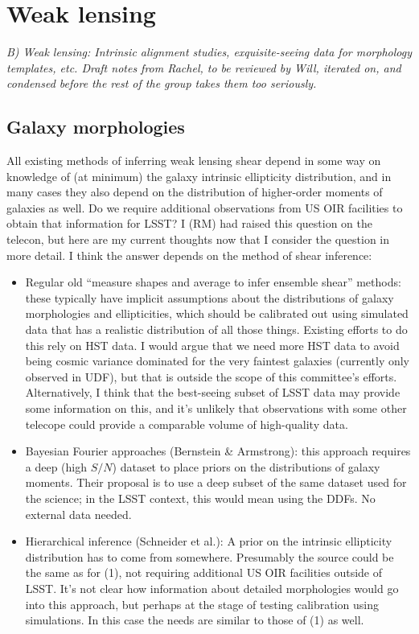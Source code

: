\section{Weak lensing}
\label{sec:wl}

{\it B) Weak lensing: Intrinsic alignment studies, exquisite-seeing data
for morphology templates, etc. Draft notes from Rachel, to be reviewed
by Will, iterated on, and condensed before the rest of the group takes
them too seriously.}

\subsection{Galaxy morphologies}

All existing methods of inferring weak lensing shear depend in some way on knowledge of (at minimum)
the galaxy intrinsic ellipticity distribution, and in many cases they also depend on the
distribution of higher-order moments of galaxies as well.  Do we require additional observations
from US OIR facilities to obtain that information for LSST?  I (RM) had raised this question on the
telecon, but here are my current thoughts now that I consider the question in more detail.  I think
the answer depends on the method of shear inference:

\begin{itemize}
\item Regular old ``measure shapes and average to infer ensemble shear'' methods: these typically
  have implicit assumptions about the distributions of galaxy morphologies and ellipticities, which
  should be calibrated out using simulated data that has a realistic distribution of all those
  things.  Existing efforts to do this rely on HST data.  I would argue that we need more HST data
  to avoid being cosmic variance dominated for the very faintest galaxies (currently only observed
  in UDF), but that is outside the scope of this committee's efforts.  Alternatively, I think that
  the best-seeing subset of LSST data may provide some information on this, and it's unlikely that
  observations with some other telecope could provide a comparable volume of high-quality data.
\item Bayesian Fourier approaches (Bernstein \& Armstrong): this approach requires a deep (high
  $S/N$) dataset to place priors on the distributions of galaxy moments.  Their proposal is to use a
  deep subset of the same dataset used for the science; in the LSST context, this would mean using
  the DDFs.  No external data needed.
\item Hierarchical inference (Schneider et al.): A prior on the intrinsic ellipticity distribution
  has to come from somewhere.  Presumably the source could be the same as for (1), not requiring
  additional US OIR facilities outside of LSST.  It's not clear how information about detailed
  morphologies would go into this approach, but perhaps at the stage of testing calibration using
  simulations.  In this case the needs are similar to those of (1) as well.
\end{itemize}

